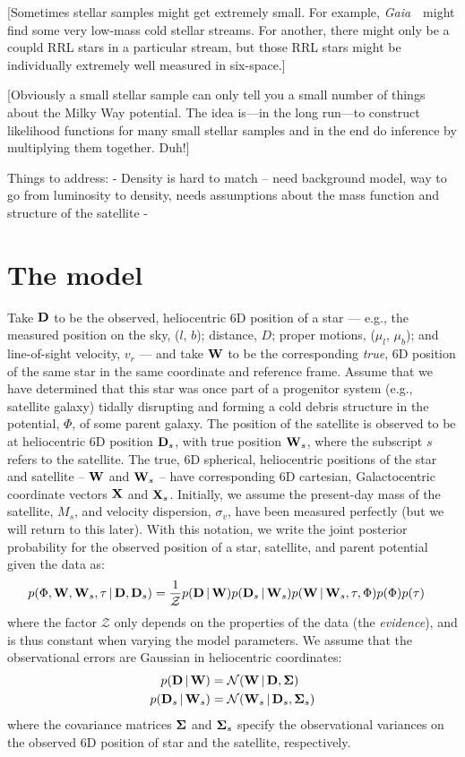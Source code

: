 \documentclass[letterpaper,12pt,preprint]{aastex}
\newcommand{\project}[1]{\textsl{#1}}
\newcommand{\gaia}{\project{Gaia}~}
\newcommand{\given}{\,|\,}
\newcommand{\D}{{\bf D}}
\newcommand{\W}{{\bf W}}
\newcommand{\X}{{\bf X}}
\newcommand{\bSigma}{{\bf \Sigma}}
\begin{document}
[Sometimes stellar samples might get extremely small.  For example,
  \gaia\ might find some very low-mass cold stellar streams.  For
  another, there might only be a coupld RRL stars in a particular
  stream, but those RRL stars might be individually extremely well
  measured in six-space.]

[Obviously a small stellar sample can only tell you a small number of
  things about the Milky Way potential.  The idea is---in the long
  run---to construct likelihood functions for many small stellar
  samples and in the end do inference by multiplying them together.
  Duh!]
  
Things to address:
- Density is hard to match -- need background model, way to go from luminosity to density, needs assumptions about the mass function and structure of the satellite
-

\section{The model}

Take $\D$ to be the observed, heliocentric 6D position of a star --- e.g., the measured position on the sky, ($l$, $b$); distance, $D$; proper motions, ($\mu_l$, $\mu_b$); and line-of-sight velocity, $v_r$ --- and take $\W$ to be the corresponding \emph{true}, 6D position of the same star in the same coordinate and reference frame. Assume that we have determined that this star was once part of a progenitor system (e.g., satellite galaxy) tidally disrupting and forming a cold debris structure in the potential, $\Phi$, of some parent galaxy. The position of the satellite is observed to be at heliocentric 6D position $\D_s$, with true position $\W_s$, where the subscript $s$ refers to the satellite. The true, 6D spherical, heliocentric positions of the star and satellite -- $\W$ and $\W_s$ -- have corresponding 6D cartesian, Galactocentric coordinate vectors $\X$ and $\X_s$. Initially, we assume the present-day mass of the satellite, $M_s$, and velocity dispersion, $\sigma_v$, have been measured perfectly (but we will return to this later). With this notation, we write the joint posterior probability for the observed position of a star, satellite, and parent potential given the data as:
\begin{align}
	p(\Phi, \W, \W_s, \tau \given \D, \D_s) &= \frac{1}{\mathcal{Z}} p(\D \given \W) p(\D_s \given \W_s) 
												       p(\W \given \W_s, \tau, \Phi) 
												       p(\Phi) p(\tau)
\end{align}
where the factor $\mathcal{Z}$ only depends on the properties of the data (the \emph{evidence}), and is thus constant when varying the model parameters. We assume that the observational errors are Gaussian in heliocentric coordinates:
\begin{align}
	p(\D \given \W) &= \mathcal{N}(\W \given \D, \bSigma)\\
	p(\D_s \given \W_s) &= \mathcal{N}(\W_s \given \D_s, \bSigma_s)
\end{align}
where the covariance matrices $\bSigma$ and $\bSigma_s$ specify the observational variances on the observed 6D position of star and the satellite, respectively. 
\end{document}
